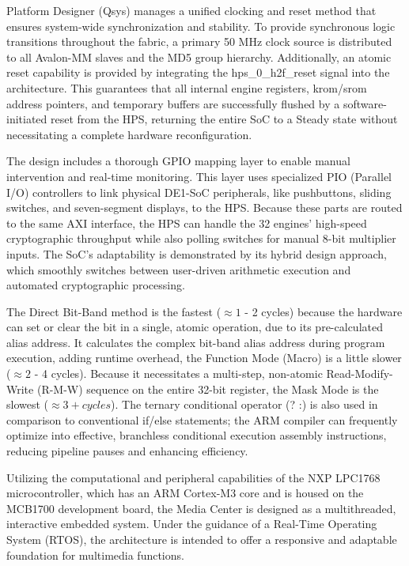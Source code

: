 \documentclass[conference]{IEEEtran}
\begin{document}
Platform Designer (Qsys) manages a unified clocking and reset method that ensures system-wide synchronization and stability. To provide synchronous logic transitions throughout the fabric, a primary 50 MHz clock source is distributed to all Avalon-MM slaves and the MD5 group hierarchy. Additionally, an atomic reset capability is provided by integrating the hps\_0\_h2f\_reset signal into the architecture. This guarantees that all internal engine registers, krom/srom address pointers, and temporary buffers are successfully flushed by a software-initiated reset from the HPS, returning the entire SoC to a Steady state without necessitating a complete hardware reconfiguration.

The design includes a thorough GPIO mapping layer to enable manual intervention and real-time monitoring. This layer uses specialized PIO (Parallel I/O) controllers to link physical DE1-SoC peripherals, like pushbuttons, sliding switches, and seven-segment displays, to the HPS. Because these parts are routed to the same AXI interface, the HPS can handle the 32 engines' high-speed cryptographic throughput while also polling switches for manual 8-bit multiplier inputs. The SoC's adaptability is demonstrated by its hybrid design approach, which smoothly switches between user-driven arithmetic execution and automated cryptographic processing.

The Direct Bit-Band method is the
fastest ($\approx 1$ - 2 cycles) because the hardware
can set or clear the bit in a single, atomic
operation, due to its pre-calculated alias
address. It calculates the complex bit-band
alias address during program execution,
adding runtime overhead, the Function
Mode (Macro) is a little slower ($\approx 2$ - 4
cycles). Because it necessitates a multi-step,
non-atomic Read-Modify-Write (R-M-W)
sequence on the entire 32-bit register, the
Mask Mode is the slowest ($\approx 3+ cycles $). The
ternary conditional operator (? :) is also used
in comparison to conventional if/else
statements; the ARM compiler can
frequently optimize into effective,
branchless conditional execution assembly
instructions, reducing pipeline pauses and
enhancing efficiency.

Utilizing the computational and
peripheral capabilities of the NXP LPC1768
microcontroller, which has an ARM
Cortex-M3 core and is housed on the
MCB1700 development board, the Media
Center is designed as a multithreaded,
interactive embedded system. Under the
guidance of a Real-Time Operating System
(RTOS), the architecture is intended to offer
a responsive and adaptable foundation for
multimedia functions.
\end{document}
